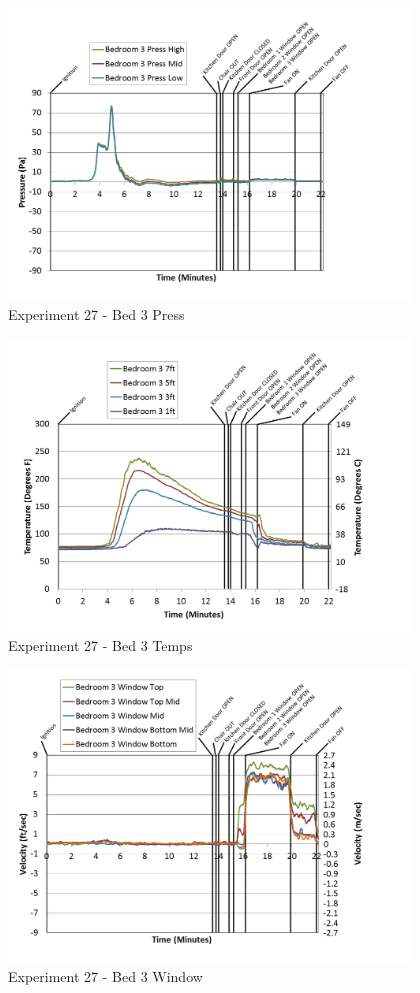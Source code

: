 \documentclass{article}
\begin{document}
\begin{appendices}
\clearpage

\begin{figure}[h!]
	\centering
	\includegraphics[height=3.05in]{0_Images/Results_Charts/Exp_27_Charts/Bed3Press.png}
	\caption{Experiment 27 - Bed 3 Press}
\end{figure}


\begin{figure}[h!]
	\centering
	\includegraphics[height=3.05in]{0_Images/Results_Charts/Exp_27_Charts/Bed3Temps.png}
	\caption{Experiment 27 - Bed 3 Temps}
\end{figure}

\clearpage

\begin{figure}[h!]
	\centering
	\includegraphics[height=3.05in]{0_Images/Results_Charts/Exp_27_Charts/Bed3Window.png}
	\caption{Experiment 27 - Bed 3 Window}
\end{figure}



\end{appendices}
\end{document}
